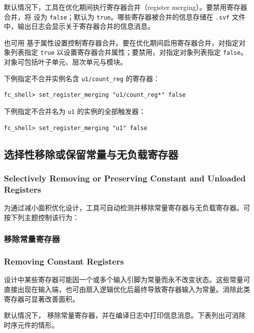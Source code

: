 默认情况下，工具在优化期间执行寄存器合并（register merging）。要禁用寄存器合并，将  设为 \texttt{false}；默认为 \texttt{true}。哪些寄存器被合并的信息存储在 \texttt{.svf} 文件中，输出日志会显示关于寄存器合并的信息消息。

也可用  基于属性设置控制寄存器合并。要在优化期间启用寄存器合并，对指定对象列表指定 \texttt{true} 以设置寄存器合并属性；要禁用，对指定对象列表指定 \texttt{false}。对象可包括叶子单元、层次单元与模块。

下例指定不合并实例名含 \texttt{u1/count\_reg} 的寄存器：
\begin{lstlisting}
fc_shell> set_register_merging "u1/count_reg*" false
\end{lstlisting}

下例指定不合并名为 \texttt{u1} 的实例的全部触发器：
\begin{lstlisting}
fc_shell> set_register_merging "u1" false
\end{lstlisting}

\subsection{选择性移除或保留常量与无负载寄存器}
\subsubsection*{Selectively Removing or Preserving Constant and Unloaded Registers}

为通过减小面积优化设计，工具可自动检测并移除常量寄存器与无负载寄存器。可按下列主题控制该行为：

\subsubsection{移除常量寄存器}
\subsubsection*{Removing Constant Registers}

设计中某些寄存器可能因一个或多个输入引脚为常量而永不改变状态。这些常量可直接出现在输入端，也可由扇入逻辑优化后最终导致寄存器输入为常量。消除此类寄存器可显著改善面积。

默认情况下， 移除常量寄存器，并在编译日志中打印信息消息。下表列出可消除时序元件的情形。

